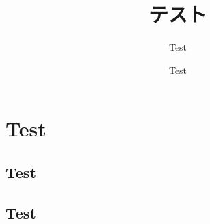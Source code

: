 \documentclass[12pt]{article}
\title{テスト}
\author{Test}
\date{Test}
\begin{document}
    \maketitle
    \section{Test}
    \subsection{Test}
    \subsection{Test}
\end{document}
